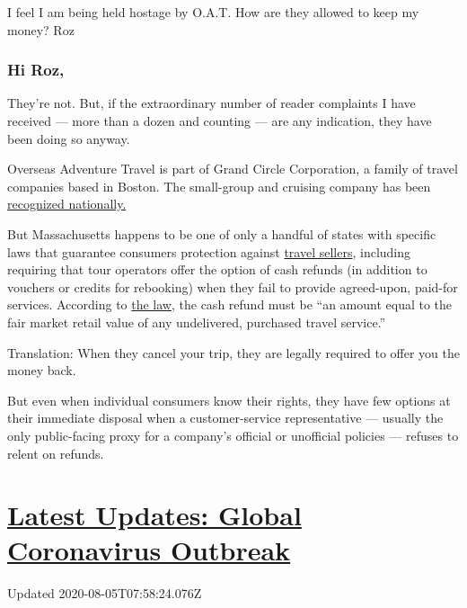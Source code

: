 I feel I am being held hostage by O.A.T. How are they allowed to keep my
money? Roz

\hypertarget{hi-roz}{%
\subsubsection{Hi Roz,}\label{hi-roz}}

They're not. But, if the extraordinary number of reader complaints I
have received --- more than a dozen and counting --- are any indication,
they have been doing so anyway.

Overseas Adventure Travel is part of Grand Circle Corporation, a family
of travel companies based in Boston. The small-group and cruising
company has been
\href{https://www.oattravel.com/oat-difference/awards}{recognized
nationally.}

But Massachusetts happens to be one of only a handful of states with
specific laws that guarantee consumers protection against
\href{https://www.mass.gov/doc/940-cmr-15-the-sale-of-travel-services/download}{travel
sellers}, including requiring that tour operators offer the option of
cash refunds (in addition to vouchers or credits for rebooking) when
they fail to provide agreed-upon, paid-for services. According to
\href{https://www.mass.gov/doc/940-cmr-15-the-sale-of-travel-services/download}{the
law,} the cash refund must be ``an amount equal to the fair market
retail value of any undelivered, purchased travel service.''

Translation: When they cancel your trip, they are legally required to
offer you the money back.

But even when individual consumers know their rights, they have few
options at their immediate disposal when a customer-service
representative --- usually the only public-facing proxy for a company's
official or unofficial policies --- refuses to relent on refunds.

\hypertarget{latest-updates-global-coronavirus-outbreak}{%
\section{\texorpdfstring{\href{https://www.nytimes.com/2020/08/04/world/coronavirus-cases.html?action=click\&pgtype=Article\&state=default\&region=MAIN_CONTENT_1\&context=storylines_live_updates}{Latest
Updates: Global Coronavirus
Outbreak}}{Latest Updates: Global Coronavirus Outbreak}}\label{latest-updates-global-coronavirus-outbreak}}

Updated 2020-08-05T07:58:24.076Z

